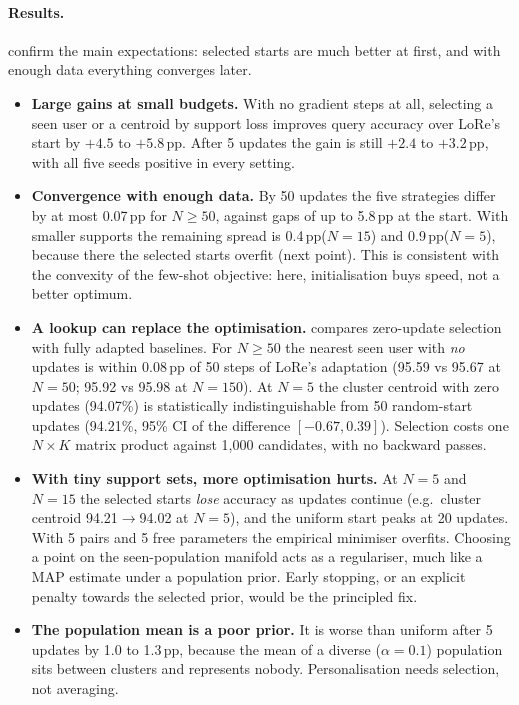 \documentclass[11pt,a4paper]{article}
\newcommand{\pp}{\,pp\xspace}
\begin{document}
\paragraph{Results.}  confirm the main expectations: selected starts are much
better at first, and with enough data everything converges later.
\begin{itemize}
\item \textbf{Large gains at small budgets.} With no gradient steps at all, selecting a seen user or a
centroid by support loss improves query accuracy over LoRe's start by $+4.5$ to $+5.8$\pp. After 5
updates the gain is still $+2.4$ to $+3.2$\pp, with all five seeds positive in every setting.
\item \textbf{Convergence with enough data.} By 50 updates the five strategies differ by at most 0.07\pp for
$N\ge50$, against gaps of up to 5.8\pp at the start. With smaller supports the remaining spread is 0.4\pp ($N=15$)
and 0.9\pp ($N=5$), because there the selected starts overfit (next point). This is consistent with the convexity of the
few-shot objective: here, initialisation buys speed, not a better optimum.
\item \textbf{A lookup can replace the optimisation.}  compares zero-update selection with
fully adapted baselines. For $N\ge50$ the nearest seen user with \emph{no} updates is within 0.08\pp of
50 steps of LoRe's adaptation (95.59 vs 95.67 at $N=50$; 95.92 vs 95.98 at $N=150$). At $N=5$ the
cluster centroid with zero updates (94.07\%) is statistically indistinguishable from 50 random-start
updates (94.21\%, 95\% CI of the difference $[-0.67, 0.39]$). Selection costs one $N\times K$ matrix
product against 1{,}000 candidates, with no backward passes.
\item \textbf{With tiny support sets, more optimisation hurts.} At $N=5$ and $N=15$ the selected
starts \emph{lose} accuracy as updates continue (e.g.\ cluster centroid 94.21$\to$94.02 at $N=5$), and
the uniform start peaks at 20 updates. With 5 pairs and 5 free parameters the empirical minimiser
overfits. Choosing a point on the seen-population manifold acts as a regulariser, much like a MAP
estimate under a population prior. Early stopping, or an explicit penalty towards the selected
prior, would be the principled fix.
\item \textbf{The population mean is a poor prior.} It is worse than uniform after 5 updates by 1.0
to 1.3\pp, because the mean of a diverse ($\alpha=0.1$) population sits between clusters and
represents nobody. Personalisation needs selection, not averaging.

\end{itemize}
\end{document}
